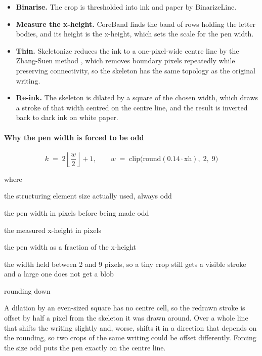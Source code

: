 \begin{itemize}\setlength\itemsep{0pt}
  \item \textbf{Binarise.} The crop is thresholded into ink and paper by BinarizeLine.
  \item \textbf{Measure the x-height.} CoreBand finds the band of rows holding the letter bodies, and its height is the x-height, which sets the scale for the pen width.
  \item \textbf{Thin.} Skeletonize reduces the ink to a one-pixel-wide centre line by the Zhang-Suen method \cite{zhangsuen1984}, which removes boundary pixels repeatedly while preserving connectivity, so the skeleton has the same topology as the original writing.
  \item \textbf{Re-ink.} The skeleton is dilated by a square of the chosen width, which draws a stroke of that width centred on the centre line, and the result is inverted back to dark ink on white paper.
\end{itemize}

\paragraph{Why the pen width is forced to be odd}

\begin{equation}
k \;=\; 2\left\lfloor \frac{w}{2} \right\rfloor + 1, \qquad w \;=\; \mathrm{clip}\big(\mathrm{round}(0.14 \cdot \mathrm{xh}),\; 2,\; 9\big)
\end{equation}

\noindent where
\begin{description}[leftmargin=2.4em,style=nextline,font=\normalfont\ttfamily]\setlength\itemsep{1pt}
  \item[{$k$}] \normalfont the structuring element size actually used, always odd
  \item[{$w$}] \normalfont the pen width in pixels before being made odd
  \item[{$\mathrm{xh}$}] \normalfont the measured x-height in pixels
  \item[{$0.14$}] \normalfont the pen width as a fraction of the x-height
  \item[{$\mathrm{clip}(\cdot,2,9)$}] \normalfont the width held between 2 and 9 pixels, so a tiny crop still gets a visible stroke and a large one does not get a blob
  \item[{$\lfloor \cdot \rfloor$}] \normalfont rounding down
\end{description}
A dilation by an even-sized square has no centre cell, so the redrawn stroke is offset by half a pixel from the skeleton it was drawn around. Over a whole line that shifts the writing slightly and, worse, shifts it in a direction that depends on the rounding, so two crops of the same writing could be offset differently. Forcing the size odd puts the pen exactly on the centre line.


